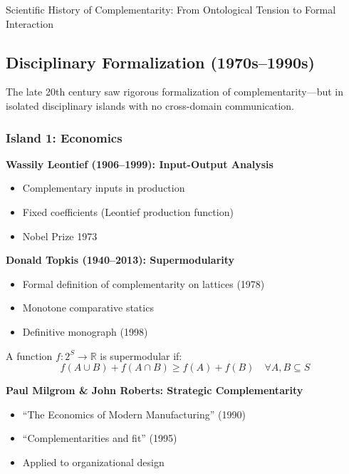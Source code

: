 \begin{chapter}{Scientific History of Complementarity: From Ontological Tension to Formal Interaction}
\subsection{Disciplinary Formalization (1970s--1990s)}

\begin{tcolorbox}[colback=green!5!white,colframe=green!75!black,title=\textbf{The Fragmentation Paradox}]
The late 20th century saw rigorous formalization of complementarity---but in isolated disciplinary islands with no cross-domain communication.
\end{tcolorbox}

\subsubsection{Island 1: Economics}

\textbf{Wassily Leontief (1906--1999): Input-Output Analysis}
\begin{itemize}[noitemsep]
    \item Complementary inputs in production
    \item Fixed coefficients (Leontief production function)
    \item Nobel Prize 1973
\end{itemize}

\textbf{Donald Topkis (1940--2013): Supermodularity}
\begin{itemize}[noitemsep]
    \item Formal definition of complementarity on lattices (1978)
    \item Monotone comparative statics
    \item Definitive monograph (1998)
\end{itemize}

\begin{definition}
A function $f: 2^S \to \mathbb{R}$ is supermodular if:
\[
f(A \cup B) + f(A \cap B) \geq f(A) + f(B) \quad \forall A, B \subseteq S
\]
\end{definition}

\textbf{Paul Milgrom \& John Roberts: Strategic Complementarity}
\begin{itemize}[noitemsep]
    \item ``The Economics of Modern Manufacturing'' (1990)
    \item ``Complementarities and fit'' (1995)
    \item Applied to organizational design
\end{itemize}


\end{chapter}

